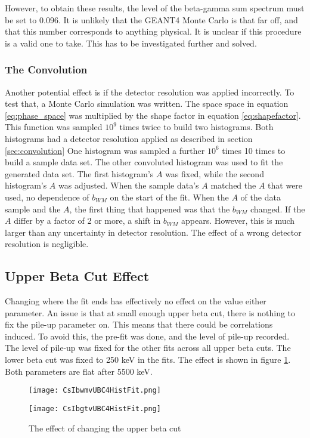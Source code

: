 \documentclass[../MaxHughesThesis.tex]{subfiles}
\begin{document}
However, to obtain these results, the level of the beta-gamma sum spectrum must be set to 0.096. 
It is unlikely that the GEANT4 Monte Carlo is that far off, and that this number corresponds to anything physical.
It is unclear if this procedure is a valid one to take.
This has to be investigated further and solved.

\subsubsection{The Convolution}

Another potential effect is if the detector resolution was applied incorrectly.
To test that, a Monte Carlo simulation was written.
The space space in equation \ref{eq:phase_space} was multiplied by the shape factor in equation \ref{eq:shapefactor}.
This function was sampled $10^{9}$ times twice to build two histograms. 
Both histograms had a detector resolution applied as described in section \ref{sec:convolution}
One histogram was sampled a further $10^{6}$ times 10 times to build a sample data set.
The other convoluted histogram was used to fit the generated data set.
The first histogram's $A$ was fixed, while the second histogram's $A$ was adjusted.
When the sample data's $A$ matched the $A$ that were used, no dependence of $b_{WM}$ on the start of the fit.
When the $A$ of the data sample and the $A$, the first thing that happened was that the $b_{WM}$ changed.
If the $A$ differ by a factor of 2 or more, a shift in $b_{WM}$ appears.
However, this is much larger than any uncertainty in detector resolution.
The effect of a wrong detector resolution is negligible. 

\subsection{Upper Beta Cut Effect}

Changing where the fit ends has effectively no effect on the value either parameter.
An issue is that at small enough upper beta cut, there is nothing to fix the pile-up parameter on. 
This means that there could be correlations induced.
To avoid this, the  pre-fit was done, and the level of pile-up recorded.
The level of pile-up was fixed for the other fits across all upper beta cuts.
The lower beta cut was fixed to 250 keV in the fits. 
The effect is shown in figure \ref{fig:UBCEffect}.
Both parameters are flat after 5500 keV.

\begin{figure}
    \centering
    \begin{minipage}{0.50\textwidth}
        \centerline{\texttt{[image: CsIbwmvUBC4HistFit.png]}}
    \end{minipage}\hfill
    \begin{minipage}{0.50\textwidth}
        \centerline{\texttt{[image: CsIbgtvUBC4HistFit.png]}}
    \end{minipage}
    \caption{The effect of changing the upper beta cut}
    \label{fig:UBCEffect}
\end{figure}
\end{document}
